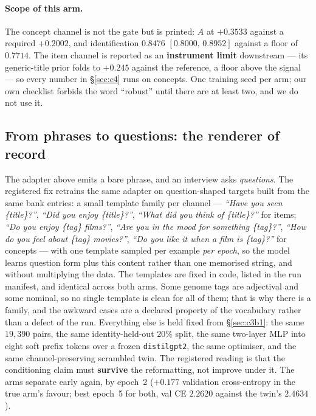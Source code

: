 \documentclass[11pt]{article}
\begin{document}
\paragraph{Scope of this arm.} The concept channel is not the gate but is printed: $A$ at $+0.3533$
against a required $+0.2002$, and identification $0.8476$ $[0.8000,\,0.8952]$ against a floor of
$0.7714$. The item channel is reported as an \textbf{instrument limit} downstream --- its
generic-title prior folds to $+0.245$ against the reference, a floor above the signal --- so every
number in \S\ref{sec:c4} runs on concepts. One training seed per arm; our own checklist forbids the
word ``robust'' until there are at least two, and we do not use it.

\subsection{From phrases to questions: the renderer of record}
\label{sec:c3b2}

The adapter above emits a bare phrase, and an interview asks \emph{questions}. The registered fix
retrains the same adapter on question-shaped targets built from the same bank entries: a small
template family per channel --- \emph{``Have you seen \{title\}?''}, \emph{``Did you enjoy
\{title\}?''}, \emph{``What did you think of \{title\}?''} for items; \emph{``Do you enjoy \{tag\}
films?''}, \emph{``Are you in the mood for something \{tag\}?''}, \emph{``How do you feel about
\{tag\} movies?''}, \emph{``Do you like it when a film is \{tag\}?''} for concepts --- with one
template sampled per example \emph{per epoch}, so the model learns question form plus this content
rather than one memorised string, and without multiplying the data. The templates are fixed in code,
listed in the run manifest, and identical across both arms. Some genome tags are adjectival and some
nominal, so no single template is clean for all of them; that is why there is a family, and the
awkward cases are a declared property of the vocabulary rather than a defect of the run. Everything
else is held fixed from \S\ref{sec:c3b1}: the same $19{,}390$ pairs, the same identity-held-out
$20\%$ split, the same two-layer MLP into eight soft prefix tokens over a frozen
\texttt{distilgpt2}, the same optimiser, and the same channel-preserving scrambled twin. The
registered reading is that the conditioning claim must \textbf{survive} the reformatting, not
improve under it. The arms separate early again, by epoch~2 ($+0.177$ validation cross-entropy in
the true arm's favour; best epoch~5 for both, val CE $2.2620$ against the twin's $2.4634$).
\end{document}
